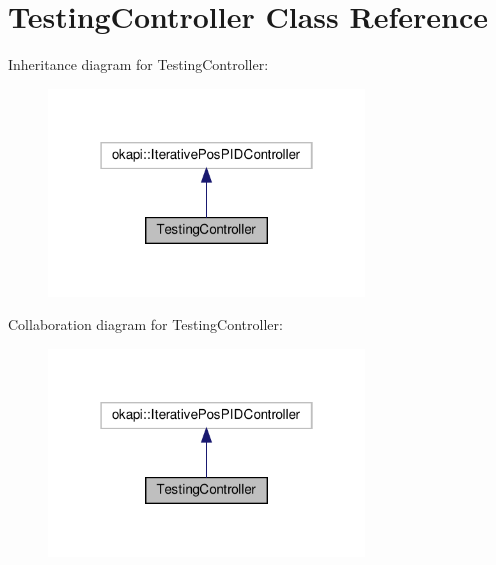 \hypertarget{classTestingController}{}\section{Testing\+Controller Class Reference}
\label{classTestingController}


Inheritance diagram for Testing\+Controller\+:\nopagebreak
\begin{figure}[H]
\begin{center}
\leavevmode
\includegraphics[width=238pt]{classTestingController__inherit__graph}
\end{center}
\end{figure}


Collaboration diagram for Testing\+Controller\+:\nopagebreak
\begin{figure}[H]
\begin{center}
\leavevmode
\includegraphics[width=238pt]{classTestingController__coll__graph}
\end{center}
\end{figure}
